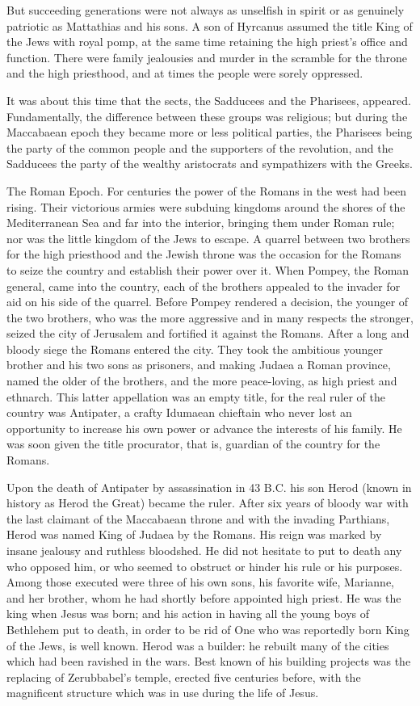 But succeeding generations were not always as unselfish in spirit or as genuinely patriotic as Mattathias and his sons. A son of Hyrcanus assumed the title King of the Jews with royal pomp, at the same time retaining the high priest's office and function. There were family jealousies and murder in the scramble for the throne and the high priesthood, and at times the people were sorely oppressed.

It was about this time that the sects, the Sadducees and the Pharisees, appeared. Fundamentally, the difference between these groups was religious; but during the Maccabaean epoch they became more or less political parties, the Pharisees being the party of the common people and the supporters of the revolution, and the Sadducees the party of the wealthy aristocrats and sympathizers with the Greeks.

The Roman Epoch. For centuries the power of the Romans in the west had been rising. Their victorious armies were subduing kingdoms around the shores of the Mediterranean Sea and far into the interior, bringing them under Roman rule; nor was the little kingdom of the Jews to escape. A quarrel between two brothers for the high priesthood and the Jewish throne was the occasion for the Romans to seize the country and establish their power over it. When Pompey, the Roman general, came into the country, each of the brothers appealed to the invader for aid on his side of the quarrel. Before Pompey rendered a decision, the younger of the two brothers, who was the more aggressive and in many respects the stronger, seized the city of Jerusalem and fortified it against the Romans. After a long and bloody siege the Romans entered the city. They took the ambitious younger brother and his two sons as prisoners, and making Judaea a Roman province, named the older of the brothers, and the more peace-loving, as high priest and ethnarch. This latter appellation was an empty title, for the real ruler of the country was Antipater, a crafty Idumaean chieftain who never lost an opportunity to increase his own power or advance the interests of his family. He was soon given the title procurator, that is, guardian of the country for the Romans.

Upon the death of Antipater by assassination in 43 B.C. his son Herod (known in history as Herod the Great) became the ruler. After six years of bloody war with the last claimant of the Maccabaean throne and with the invading Parthians, Herod was named King of Judaea by the Romans. His reign was marked by insane jealousy and ruthless bloodshed. He did not hesitate to put to death any who opposed him, or who seemed to obstruct or hinder his rule or his purposes. Among those executed were three of his own sons, his favorite wife, Marianne, and her brother, whom he had shortly before appointed high priest. He was the king when Jesus was born; and his action in having all the young boys of Bethlehem put to death, in order to be rid of One who was reportedly born King of the Jews, is well known. Herod was a builder: he rebuilt many of the cities which had been ravished in the wars. Best known of his building projects was the replacing of Zerubbabel's temple, erected five centuries before, with the magnificent structure which was in use during the life of Jesus.

